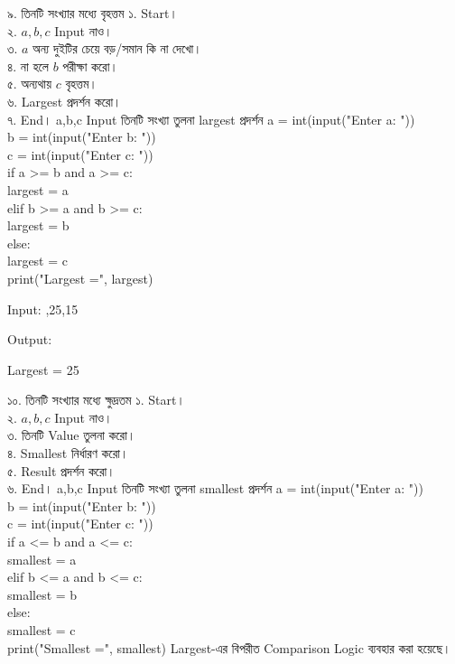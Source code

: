 \exerciseTable
{৯. তিনটি সংখ্যার মধ্যে বৃহত্তম}
{
১. Start।\\
২. \(a,b,c\) Input নাও।\\
৩. \(a\) অন্য দুইটির চেয়ে বড়/সমান কি না দেখো।\\
৪. না হলে \(b\) পরীক্ষা করো।\\
৫. অন্যথায় \(c\) বৃহত্তম।\\
৬. Largest প্রদর্শন করো।\\
৭. End।
}
{
\linearflow
{a,b,c Input}
{তিনটি সংখ্যা তুলনা}
{largest প্রদর্শন}
}
{
a = int(input("Enter a: "))\\
b = int(input("Enter b: "))\\
c = int(input("Enter c: "))\\[0.5mm]
if a >= b and a >= c:\\
\hspace*{4mm}largest = a\\
elif b >= a and b >= c:\\
\hspace*{4mm}largest = b\\
else:\\
\hspace*{4mm}largest = c\\
print("Largest =", largest)
}
{
Input:
\textenglish{,25,15}

\medskip

Output:

\textenglish{\ttfamily Largest = 25}
}


\exerciseTable
{১০. তিনটি সংখ্যার মধ্যে ক্ষুদ্রতম}
{
১. Start।\\
২. \(a,b,c\) Input নাও।\\
৩. তিনটি Value তুলনা করো।\\
৪. Smallest নির্ধারণ করো।\\
৫. Result প্রদর্শন করো।\\
৬. End।
}
{
\linearflow
{a,b,c Input}
{তিনটি সংখ্যা তুলনা}
{smallest প্রদর্শন}
}
{
a = int(input("Enter a: "))\\
b = int(input("Enter b: "))\\
c = int(input("Enter c: "))\\[0.5mm]
if a <= b and a <= c:\\
\hspace*{4mm}smallest = a\\
elif b <= a and b <= c:\\
\hspace*{4mm}smallest = b\\
else:\\
\hspace*{4mm}smallest = c\\
print("Smallest =", smallest)
}
{
Largest-এর বিপরীত Comparison Logic ব্যবহার করা হয়েছে।
}

